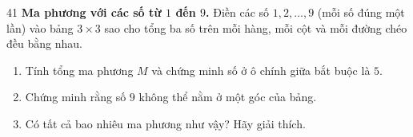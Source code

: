\begin{probbox}{41}{}
\textbf{Ma phương với các số từ $1$ đến $9$.} Điền các số $1, 2, \dots, 9$ (mỗi số đúng một lần) vào bảng $3\times 3$ sao
cho tổng ba số trên mỗi hàng, mỗi cột và mỗi đường chéo đều bằng nhau.
\begin{enumerate}[label=\alph*),leftmargin=1.6em,itemsep=1pt,topsep=2pt]
  \item Tính tổng ma phương $M$ và chứng minh số ở ô chính giữa bắt buộc là $5$.
  \item Chứng minh rằng số $9$ không thể nằm ở một góc của bảng.
  \item Có tất cả bao nhiêu ma phương như vậy? Hãy giải thích.
\end{enumerate}
\end{probbox}
